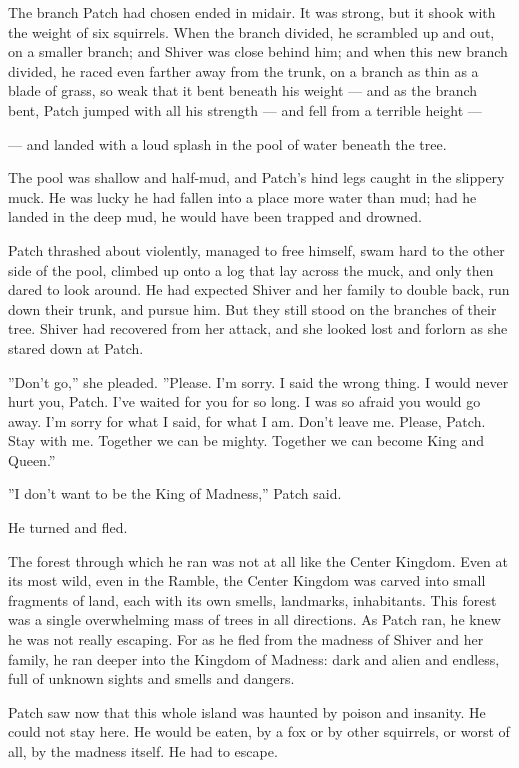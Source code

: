 \documentclass[12pt]{book}
\begin{document}
The branch Patch had chosen ended in midair. It was strong, but it
shook with the weight of six squirrels. When the branch divided, he
scrambled up and out, on a smaller branch; and Shiver was close behind
him; and when this new branch divided, he raced even farther away from
the trunk, on a branch as thin as a blade of grass, so weak that it
bent beneath his weight --- and as the branch bent, Patch jumped with
all his strength --- and fell from a terrible height ---

--- and landed with a loud splash in the pool of water beneath the
tree.

The pool was shallow and half-mud, and Patch's hind legs caught in the
slippery muck. He was lucky he had fallen into a place more water than
mud; had he landed in the deep mud, he would have been trapped and
drowned.

Patch thrashed about violently, managed to free himself, swam hard to
the other side of the pool, climbed up onto a log that lay across the
muck, and only then dared to look around. He had expected Shiver and
her family to double back, run down their trunk, and pursue him. But
they still stood on the branches of their tree. Shiver had recovered
from her attack, and she looked lost and forlorn as she stared down at
Patch.

''Don't go,'' she pleaded. ''Please. I'm sorry. I said the wrong
thing. I would never hurt you, Patch. I've waited for you for so
long. I was so afraid you would go away. I'm sorry for what I said,
for what I am. Don't leave me. Please, Patch. Stay with me. Together
we can be mighty. Together we can become King and Queen.''

''I don't want to be the King of Madness,'' Patch said.

He turned and fled.

The forest through which he ran was not at all like the Center
Kingdom. Even at its most wild, even in the Ramble, the Center Kingdom
was carved into small fragments of land, each with its own smells,
landmarks, inhabitants. This forest was a single overwhelming mass of
trees in all directions. As Patch ran, he knew he was not really
escaping. For as he fled from the madness of Shiver and her family, he
ran deeper into the Kingdom of Madness: dark and alien and endless,
full of unknown sights and smells and dangers.

Patch saw now that this whole island was haunted by poison and
insanity. He could not stay here. He would be eaten, by a fox or by
other squirrels, or worst of all, by the madness itself. He had to
escape.
\end{document}
